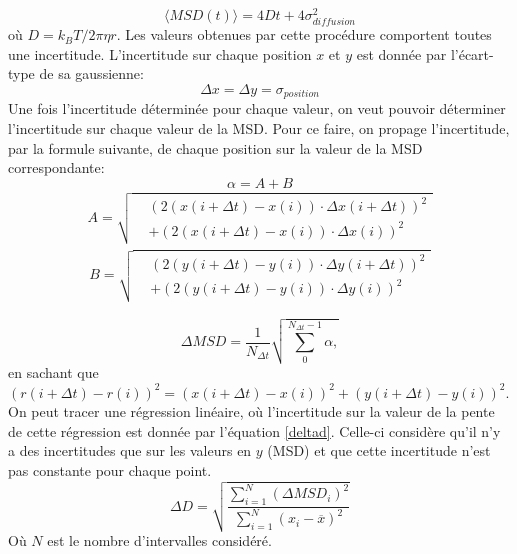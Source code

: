 \documentclass[conference]{IEEEtran}
\begin{document}
\begin{equation}
  \langle MSD(t) \rangle = 4Dt + 4\sigma_{diffusion}^{2}
\end{equation}
où $D=k_{B}T/2\pi \eta r$.
Les valeurs obtenues par cette procédure comportent toutes une incertitude. L'incertitude sur chaque 
position $x$ et $y$ est donnée par l'écart-type de sa gaussienne:
\begin{equation}
  \Delta x=\Delta y=\sigma_{position}
\end{equation}
Une fois l'incertitude déterminée pour chaque valeur, on veut pouvoir déterminer l'incertitude sur chaque valeur de la MSD. 
Pour ce faire, on propage l'incertitude, par la formule suivante, de chaque position sur la valeur de la MSD  correspondante: 
\begin{equation}
  \alpha =A+B
\end{equation}
\begin{align*}
  A = \sqrt{
    \begin{aligned}
      &\left( 2(x(i+\Delta t) - x(i))\cdot \Delta x(i+\Delta t) \right)^2 \\
      &+ \left( 2(x(i+\Delta t) - x(i))\cdot \Delta x(i) \right)^2
    \end{aligned}
  }
\end{align*}
\begin{align*}
  B = \sqrt{
    \begin{aligned}
      &\left( 2(y(i+\Delta t) - y(i))\cdot \Delta y(i+\Delta t) \right)^2 \\
      &+ \left( 2(y(i+\Delta t) - y(i))\cdot \Delta y(i) \right)^2
    \end{aligned}
  }
\end{align*}

\begin{equation}
  \Delta MSD=\frac{1}{N_{\Delta t}}\sqrt{\sum_{0}^{N_{\Delta t}-1}\alpha, }
\end{equation}
en sachant que $\left ( r(i+\Delta t)-r(i) \right )^{2}=\left ( x(i+\Delta t)-x(i) \right )^{2}+\left ( y(i+\Delta t)-y(i) \right )^{2}$.
On peut tracer une régression linéaire, où l'incertitude sur la valeur de la pente de cette régression est donnée par l'équation \ref{deltad}.
Celle-ci considère qu'il n'y a des incertitudes que sur les valeurs en $y$ (MSD) et que cette incertitude n'est pas constante pour chaque point.
\begin{equation}\label{deltad}
  \Delta D=\sqrt{\frac{\sum_{i=1}^{N}(\Delta MSD_{i})^{2}}{\sum_{i=1}^{N}{(x_{i}-\overline{x})^{2}}}}
\end{equation}
Où $N$ est le nombre d'intervalles considéré. 
\end{document}
